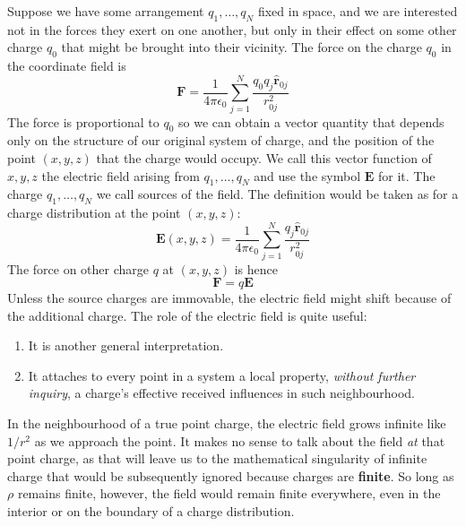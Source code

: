 Suppose we have some arrangement $q_{1},\dots,q_{N}$ fixed in space, and we are interested not in the forces they exert on one another, but only in their effect on some other charge $q_{0}$ that might be brought into their vicinity. The force on the charge $q_{0}$ in the coordinate field is $$\mathbf{F}= \frac{1}{4\pi \epsilon_{0}} \sum^{N}_{j=1} \frac{q_{0}q_{j}\mathbf{\hat{r}}_{0j}}{r^{2}_{0j}}$$
The force is proportional to $q_{0}$ so we can obtain a vector quantity that depends only on the structure of our original system of charge, and the position of the point $(x,y,z)$ that the charge would occupy. We call this vector function of $x,y,z$ the electric field arising from $q_{1},\dots,q_{N}$ and use the symbol $\mathbf{E}$ for it. The charge $q_{1},\dots,q_{N}$ we call sources of the field. The definition would be taken as for a charge distribution at the point $(x,y,z)$: $$\mathbf{E}(x,y,z)= \frac{1}{4\pi \epsilon_{0}} \sum^{N}_{j=1} \frac{q_{j}\mathbf{\hat{r}}_{0j}}{r^{2}_{0j}}$$
The force on other charge $q$ at $(x,y,z)$ is hence $$\mathbf{F}= q\mathbf{E}$$
Unless the source charges are immovable, the electric field might shift because of the additional charge. 
The role of the electric field is quite useful: 
\begin{enumerate}[topsep=0.5pt]
    \item It is another general interpretation. 
    \item It attaches to every point in a system a local property, \textit{without further inquiry}, a charge's effective received influences in such neighbourhood. 
\end{enumerate}

In the neighbourhood of a true point charge, the electric field grows infinite like $1/r^{2}$ as we approach the point. It makes no sense to talk about the field \textit{at} that point charge, as that will leave us to the mathematical singularity of infinite charge that would be subsequently ignored because charges are \textbf{finite}. So long as $\rho$ remains finite, however, the field would remain finite everywhere, even in the interior or on the boundary of a charge distribution. 
